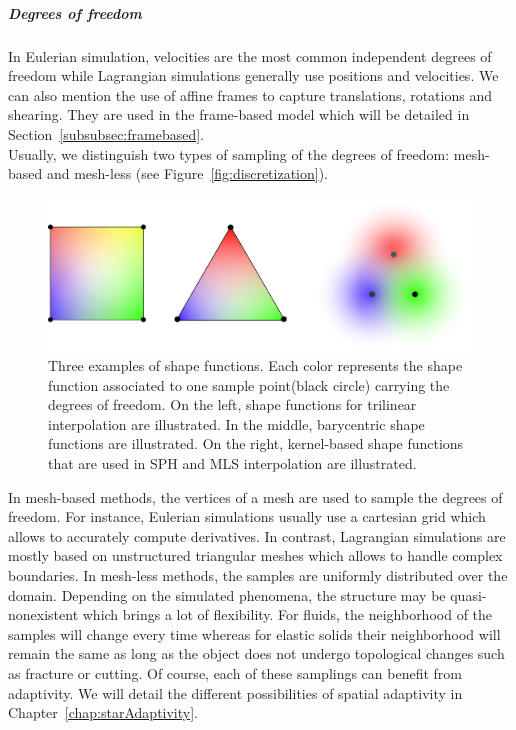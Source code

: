 \subparagraph{Degrees of freedom}
In Eulerian simulation, velocities are the most common independent degrees of freedom while Lagrangian simulations generally use positions and velocities. 
We can also mention the use of affine frames to capture translations, rotations and shearing. They are used in the frame-based model which will be detailed in Section~\ref{subsubsec:framebased}.
\\ 
Usually, we distinguish two types of sampling of the degrees of freedom: mesh-based and mesh-less (see Figure~\ref{fig:discretization}).
\begin{figure}[!h]
	\centering
	\includegraphics[width=\linewidth]{images/continuum_mechanics/shapefunction.png}
	\caption[STAR mechanics: Shape functions]{\label{fig:shapefunction} 
		Three examples of shape functions. 
		Each color represents the shape function associated to one sample point(black circle) carrying the degrees of freedom. 
		On the left, shape functions for trilinear interpolation are illustrated. 
		In the middle, barycentric shape functions are illustrated. 
		On the right, kernel-based shape functions that are used in SPH and MLS interpolation are illustrated.}
\end{figure}
In mesh-based methods, the vertices of a mesh are used to sample the degrees of freedom. For instance, Eulerian simulations usually use a cartesian grid which allows to accurately compute derivatives. 
In contrast, Lagrangian simulations are mostly based on unstructured triangular meshes which allows to handle complex boundaries.
In mesh-less methods, the samples are uniformly distributed over the domain. Depending on the simulated phenomena, the structure may be quasi-nonexistent which brings a lot of flexibility. For fluids, the neighborhood of the samples will change every time whereas for elastic solids their neighborhood will remain the same as long as the object does not undergo topological changes such as fracture or cutting.
Of course, each of these samplings can benefit from adaptivity. We will detail the different possibilities of spatial adaptivity in Chapter~\ref{chap:starAdaptivity}.

